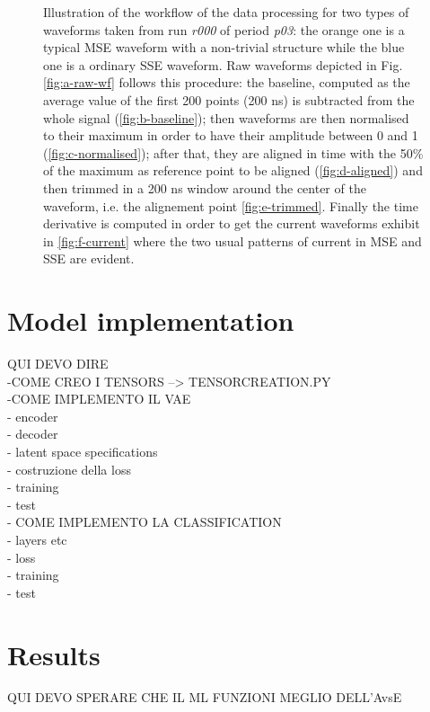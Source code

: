 \begin{figure}[H]
    \caption{Illustration of the workflow of the data processing for two types of waveforms taken from run \textit{r000} of period \textit{p03}: the orange one is a typical \ac{MSE} waveform with a non-trivial structure while the blue one is a ordinary \ac{SSE} waveform. Raw waveforms depicted in Fig.\ref{fig:a-raw-wf} follows this procedure: the baseline, computed as the average value of the first 200 points (200 ns) is subtracted from the whole signal (\ref{fig:b-baseline}); then waveforms are then normalised to their maximum in order to have their amplitude between 0 and 1 (\ref{fig:c-normalised}); after that, they are aligned in time with the 50\% of the maximum as reference point to be aligned (\ref{fig:d-aligned}) and then trimmed in a 200 ns window around the center of the waveform, i.e. the alignement point \ref{fig:e-trimmed}. Finally the time derivative is computed in order to get the current waveforms exhibit in \ref{fig:f-current} where the two usual patterns of current in \ac{MSE} and \ac{SSE} are evident.}
    \label{fig:data-cleaning}
\end{figure}

\newpage
\section{Model implementation}
\label{sec:model-implementation}

QUI DEVO DIRE\\

-COME CREO I TENSORS --> TENSORCREATION.PY\\

-COME IMPLEMENTO IL VAE\\
    - encoder\\
    - decoder\\
    - latent space specifications\\
    - costruzione della loss\\
    - training\\ 
    - test\\

- COME IMPLEMENTO LA CLASSIFICATION\\
    - layers etc\\ 
    - loss\\
    - training \\
    - test \\

\section{Results}
QUI DEVO SPERARE CHE IL ML FUNZIONI MEGLIO DELL'AvsE